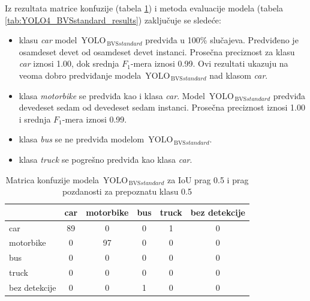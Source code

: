 \documentclass[12pt,oneside]{memoir}
\newcommand{\yolo}{\ensuremath{\,\textrm{YOLO}}}
\newcommand{\bvs}{\ensuremath{\,\textrm{BVS}}}
\begin{document}
Iz rezultata matrice konfuzije (tabela \ref{tab:YOLO4_BVSstandard_confusion_mat}) i metoda evaluacije modela (tabela \ref{tab:YOLO4_BVSstandard_results}) zaključuje se sledeće:
\begin{itemize}
    \item klasu \textit{car} model $\yolo_{\bvs{standard}}$ predviđa u 100\% slučajeva. Predviđeno je osamdeset devet od osamdeset devet instanci. Prosečna preciznost za klasu \textit{car} iznosi 1.00, dok srednja $F_1$-mera iznosi 0.99. Ovi rezultati ukazuju na veoma dobro predviđanje modela  $\yolo_{\bvs{standard}}$ nad klasom \textit{car}.
    \item klasa \textit{motorbike} se predviđa kao i klasa \textit{car}. Model  $\yolo_{\bvs{standard}}$ predviđa devedeset sedam od devedeset sedam instanci. Prosečna preciznost iznosi 1.00 i srednja $F_1$-mera iznosi 0.99.
    \item klasa \textit{bus} se ne predviđa modelom  $\yolo_{\bvs{standard}}$.
    \item klasa \textit{truck} se pogrešno predviđa kao klasa \textit{car}. 
\end{itemize}



\begin{table}
    \begin{center}
    \caption{Matrica konfuzije modela $\yolo_{\bvs{standard}}$ za IoU prag 0.5 i prag pozdanosti za prepoznatu klasu 0.5 }
    \begin{tabular}{ l|c|c|c|c|c|}
                  & car  & motorbike & bus & truck & bez detekcije \\ \hline
    car           & 89   & 0         & 0   & 1     & 0             \\ 
    motorbike     & 0    & 97        & 0   & 0     & 0             \\ 
    bus           & 0    & 0         & 0   & 0     & 0             \\ 
    truck         & 0    & 0         & 0   & 0     & 0             \\ 
    bez detekcije & 0    & 0         & 1   & 0     & 0             \\ \hline
    \hline
    \end{tabular}
    \label{tab:YOLO4_BVSstandard_confusion_mat}
    \end{center}
\end{table}
\end{document}
